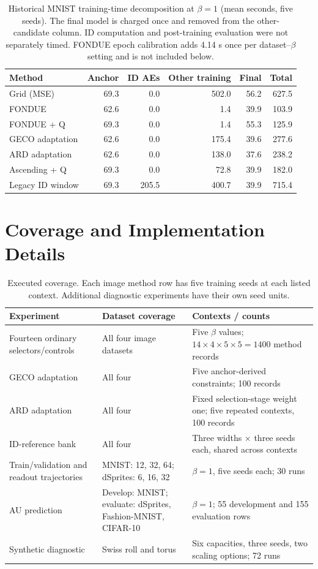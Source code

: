 \documentclass[make,article,submit,pdftex,moreauthors]{Definitions/mdpi}
\begin{document}
\begin{table}[H]
\caption{Historical MNIST training-time decomposition at $\beta=1$ (mean seconds, five seeds). The final model is charged once and removed from the other-candidate column. ID computation and post-training evaluation were not separately timed. FONDUE epoch calibration adds 4.14 s once per dataset--$\beta$ setting and is not included below.}\label{tab:cost}
\footnotesize
\setlength{\tabcolsep}{3.5pt}
\begin{tabular*}{\textwidth}{@{\extracolsep{\fill}}lrrrrr@{}}
\toprule
Method & Anchor & ID AEs & Other training & Final & Total \\
\midrule
Grid (MSE) & 69.3 & 0.0 & 502.0 & 56.2 & 627.5 \\
FONDUE & 62.6 & 0.0 & 1.4 & 39.9 & 103.9 \\
FONDUE + Q & 69.3 & 0.0 & 1.4 & 55.3 & 125.9 \\
GECO adaptation & 62.6 & 0.0 & 175.4 & 39.6 & 277.6 \\
ARD adaptation & 62.6 & 0.0 & 138.0 & 37.6 & 238.2 \\
Ascending + Q & 69.3 & 0.0 & 72.8 & 39.9 & 182.0 \\
Legacy ID window & 69.3 & 205.5 & 400.7 & 39.9 & 715.4 \\
\bottomrule
\end{tabular*}
\end{table}


\section{Coverage and Implementation Details}\label{app:coverage}
\begin{table}[H]
\caption{Executed coverage. Each image method row has five training
seeds at each listed context. Additional diagnostic experiments have
their own seed units.}
\label{tab:coverage}\small
\begin{tabularx}{\textwidth}{lXX}\toprule
Experiment & Dataset coverage & Contexts / counts \\\midrule
Fourteen ordinary selectors/controls & All four image datasets & Five $\beta$ values; $14\times4\times5\times5=1400$ method records \\
GECO adaptation & All four & Five anchor-derived constraints; 100 records \\
ARD adaptation & All four & Fixed selection-stage weight one; five repeated contexts, 100 records \\
ID-reference bank & All four & Three widths $\times$ three seeds each, shared across contexts \\
Train/validation and readout trajectories & MNIST: 12, 32, 64; dSprites: 6, 16, 32 & $\beta=1$, five seeds each; 30 runs \\
AU prediction & Develop: MNIST; evaluate: dSprites, Fashion-MNIST, CIFAR-10 & $\beta=1$; 55 development and 155 evaluation rows \\
Synthetic diagnostic & Swiss roll and torus & Six capacities, three seeds, two scaling options; 72 runs \\
\bottomrule\end{tabularx}
\end{table}
\end{document}
